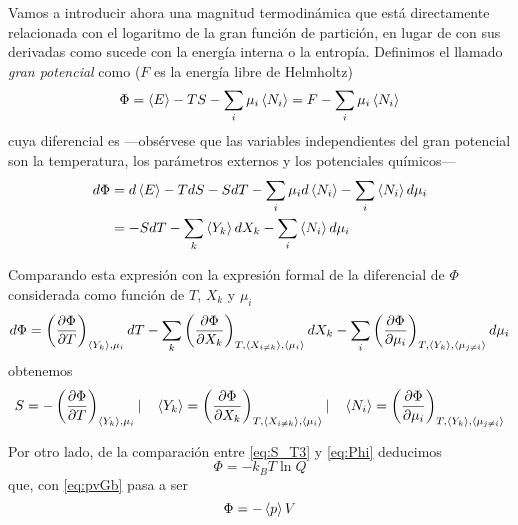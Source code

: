 Vamos a introducir ahora una magnitud termodinámica que está directamente relacionada con el logaritmo de la gran función de partición, en lugar de con sus derivadas como sucede con la energía interna o la entropía.
Definimos el llamado \emph{gran potencial} como ($F$ es la energía libre de Helmholtz)
\begin{equation}
	\Phi = \expval{E} - TS - \sum_i \mu_i \expval{N_i} = F - \sum_i \mu_i \expval{N_i} \label{eq:Phi}
\end{equation}
cuya diferencial es ---obsérvese que las variables independientes del gran potencial son la temperatura, los parámetros externos y los potenciales químicos---
\begin{align}
	d\Phi &= d\expval{E} - TdS - SdT - \sum_i \mu_i d\expval{N_i} - \sum_i  \expval{N_i} d\mu_i \nonumber \\
	      &= -SdT - \sum_k \expval{Y_k} dX_k - \sum_i  \expval{N_i} d\mu_i
\end{align}

Comparando esta expresión con la expresión formal de la diferencial de $\Phi$ considerada como función de $T$, $X_k$ y $\mu_i$
$$d\Phi = \left( \pdv{\Phi}{T} \right)_{\expval{Y_k}, \mu_i}dT - 
	\sum_k \left( \pdv{\Phi}{X_k} \right)_{T,\expval{X_{i\neq k}}, \expval{\mu_i}} dX_k -
	\sum_i  \left( \pdv{\Phi}{\mu_i} \right)_{T,\expval{Y_k}, \expval{\mu_{j\neq i}}} d\mu_i$$
obtenemos
$$S = - \left( \pdv{\Phi}{T} \right)_{\expval{Y_k}, \mu_i} | \quad
	\expval{Y_k} = \left( \pdv{\Phi}{X_k} \right)_{T,\expval{X_{i\neq k}}, \expval{\mu_i}} | \quad
	\expval{N_i} = \left( \pdv{\Phi}{\mu_i} \right)_{T,\expval{Y_k}, \expval{\mu_{j\neq i}}} $$
	
Por otro lado, de la comparación entre \eqref{eq:S_T3} y \eqref{eq:Phi} deducimos
\begin{equation}
	\Phi = -k_B T \ln Q
\end{equation}
que, con \eqref{eq:pvGb} pasa a ser
\begin{equation}
	\Phi = -\expval{p} V
\end{equation}
